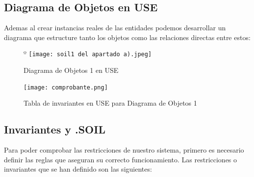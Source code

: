 \documentclass[12pt.a4paper]{article}
\begin{document}
\vspace{1.0cm}

\subsection{Diagrama de Objetos en USE}
Ademas al crear instancias reales de las entidades podemos desarrollar un diagrama que estructure tanto los objetos como las relaciones directas entre estos:
\vspace{1.0cm}
\begin{figure}[H]
º     \texttt{[image: soil1 del apartado a).jpeg]}
     \caption{Diagrama de Objetos 1 en USE}
     \label{Diagrama de Objetos 1 en USE}
\end{figure}

\begin{figure}[H]
     \texttt{[image: comprobante.png]}
     \caption{Tabla de invariantes en USE para Diagrama de Objetos 1}
     \label{Tabla de invariantes en USE para Diagrama de Objetos 1}
\end{figure}
\vspace{1.0cm}

\subsection{Invariantes y .SOIL}
Para poder comprobar las restricciones de nuestro sistema, primero es necesario definir las reglas que aseguran su correcto funcionamiento. Las restricciones o invariantes que se han definido son las siguientes:
\end{document}
